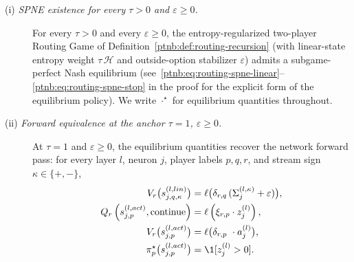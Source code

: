 \begin{theoremenv}\label{ptnb:thm:routing-forward}
\leavevmode
\begin{description}
    \item[\textnormal{(i) \emph{SPNE existence for every $\tau > 0$ and $\varepsilon \ge 0$.}}]
        For every $\tau > 0$ and every $\varepsilon \ge 0$, the entropy-regularized two-player Routing Game
        of Definition~\ref{ptnb:def:routing-recursion} (with linear-state entropy weight $\tau\,\mathcal{H}$ and
        outside-option stabilizer $\varepsilon$) admits a subgame-perfect Nash equilibrium
        (see~\eqref{ptnb:eq:routing-spne-linear}--\eqref{ptnb:eq:routing-spne-stop} in the proof for the explicit
        form of the equilibrium policy). We write $\cdot^\star$ for equilibrium quantities throughout.

    \item[\textnormal{(ii) \emph{Forward equivalence at the anchor $\tau=1$, $\varepsilon\geq 0$.}}]
        At $\tau=1$ and $\varepsilon \geq 0$, the equilibrium quantities recover the network forward pass:
        for every layer $l$, neuron $j$, player labels $p,q,r$, and stream sign $\kappa\in\{+,-\}$,
        \begin{align}
            V_r\bigl(s_{j,q,\kappa}^{(l, lin)}\bigr) &= \ell\bigl(\delta_{r,q} \, (\Sigma_j^{(l,\kappa)} +
            \varepsilon)\bigr), \label{ptnb:eq:routing-forward-linear}\\
            Q_r\left( s_{j,p}^{(l, act)}, \text{continue} \right) &= \ell \left( \xi_{r,p} \cdot z^{(l)}_j
            \right), \label{ptnb:eq:routing-forward-continue} \\
            V_r\bigl(s_{j,p}^{(l, act)}\bigr) &= \ell\bigl( \delta_{r,p}\ \cdot a_j^{(l)} \bigr),
            \label{ptnb:eq:routing-forward-act}\\
            \pi_p^\star\bigl(s_{j,p}^{(l, act)}\bigr) &= \1[z_j^{(l)} > 0]. \label{ptnb:eq:routing-forward-stop}
        \end{align}
\end{description}
\hfill{}
\end{theoremenv}

